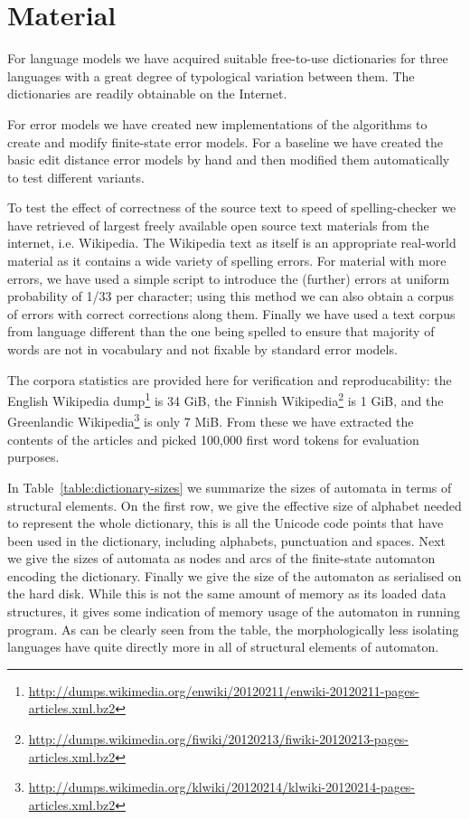 \documentclass[free]{flammie}
\begin{document}
\section{Material}
\label{sec:materials}

For language models we have acquired suitable free-to-use
dictionaries for three languages with a great degree of
typological variation between them. The dictionaries
are readily obtainable on the Internet.

For error models we have created new implementations of the algorithms
to create and modify finite-state error models. For a baseline we have created
the basic edit distance error models by hand and then modified them
automatically to test different variants.

To test the effect of correctness of the source text to speed of
spelling-checker we have retrieved of largest freely available open source text
materials from the internet, i.e. Wikipedia. The Wikipedia text as itself is
an appropriate real-world material as it contains a wide variety of spelling
errors. For material with more errors, we have used a simple script to
introduce the (further) errors at uniform probability of 1/33 per character;
using this method we can also obtain a corpus of errors with correct
corrections along them. Finally we have used a text corpus from language
different than the one being spelled to ensure that majority of words are not
in vocabulary and not fixable by standard error models.

The corpora statistics are provided here for verification and reproducability:
the English Wikipedia
dump\footnote{\url{http://dumps.wikimedia.org/enwiki/20120211/enwiki-20120211-pages-articles.xml.bz2}}
is 34 GiB, the Finnish
Wikipedia\footnote{\url{http://dumps.wikimedia.org/fiwiki/20120213/fiwiki-20120213-pages-articles.xml.bz2}}
is 1 GiB, and the Greenlandic
Wikipedia\footnote{\url{http://dumps.wikimedia.org/klwiki/20120214/klwiki-20120214-pages-articles.xml.bz2}}
is only 7 MiB. From these we have extracted the contents of the articles and
picked 100,000 first word tokens for evaluation purposes.

In Table~\ref{table:dictionary-sizes} we summarize the sizes of automata in
terms of structural elements. On the first row, we give the effective size of
alphabet needed to represent the whole dictionary, this is all the Unicode
code points that have been used in the dictionary, including alphabets,
punctuation and spaces. Next we give the sizes of automata as nodes and
arcs of the finite-state automaton encoding the dictionary. Finally we give the
size of the automaton as serialised on the hard disk. While this is not the
same amount of memory as its loaded data structures, it gives some indication
of memory usage of the automaton in running program. As can be clearly
seen from the table, the morphologically less isolating languages have quite
directly more in all of structural elements of automaton.
\end{document}

